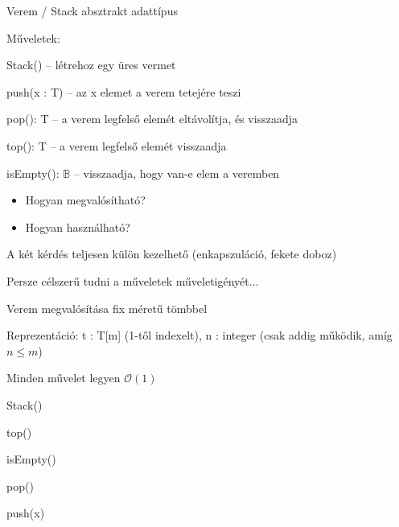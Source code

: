 \documentclass[hungarian]{beamer}
\newcommand{\Ord}{\mathcal{O}}
\begin{document}
\begin{frame}{Verem / Stack absztrakt adattípus}

Műveletek:

Stack() -- létrehoz egy üres vermet

push(x : T) -- az x elemet a verem tetejére teszi

pop(): T -- a verem legfelső elemét eltávolítja, és visszaadja

top(): T -- a verem legfelső elemét visszaadja

isEmpty(): $\mathbb{B}$ -- visszaadja, hogy van-e elem a veremben

\vspace{6mm}

\begin{itemize}
    \item Hogyan megvalósítható?
    \item Hogyan használható?
\end{itemize}

A két kérdés teljesen külön kezelhető (enkapszuláció, fekete doboz)

Persze célszerű tudni a műveletek műveletigényét...

\end{frame}

\begin{frame}[t]{Verem megvalósítása fix méretű tömbbel}

Reprezentáció: t : T[m] (1-től indexelt), n : integer (csak addig működik, amíg $n \leq m$)

Minden művelet legyen $\Ord(1)$


\noindent\hfill
\begin{stukibox*}[3cm]{Stack()}\end{stukibox*}%
\hfill
\begin{stukibox*}[3cm]{top()}\end{stukibox*}%
\hfill
\begin{stukibox*}[3cm]{isEmpty()}\end{stukibox*}%
\hfill{}

\vspace{5mm}

\noindent\hfill
\begin{stukibox*}[3cm]{pop()}\end{stukibox*}%
\hfill
\begin{stukibox*}[3cm]{push(x)}\end{stukibox*}%
\hfill{}

\end{frame}
\end{document}

